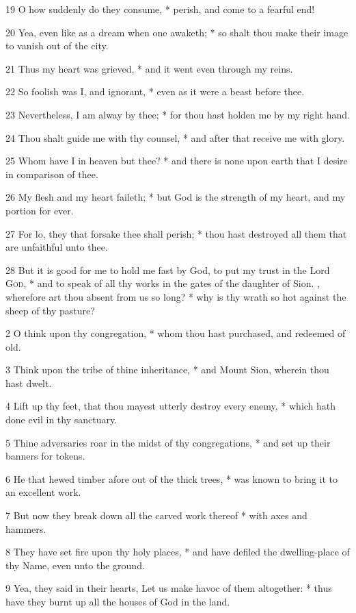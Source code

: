 19 O how suddenly do they consume, * perish, and come to a fearful end!\par
20 Yea, even like as a dream when one awaketh; * so shalt thou make their image to vanish out of the city.\par
21 Thus my heart was grieved, * and it went even through my reins.\par
22 So foolish was I, and ignorant, * even as it were a beast before thee.\par
23 Nevertheless, I am alway by thee; * for thou hast holden me by my right hand.\par
24 Thou shalt guide me with thy counsel, * and after that receive me with glory.\par
25 Whom have I in heaven but thee? * and there is none upon earth that I desire in comparison of thee.\par
26 My flesh and my heart faileth; * but God is the strength of my heart, and my portion for ever.\par
27 For lo, they that forsake thee shall perish; * thou hast destroyed all them that are unfaithful unto thee.\par
28 But it is good for me to hold me fast by God, to put my trust in the Lord \textsc{God}, * and to speak of all thy works in the gates of the daughter of Sion.
, wherefore art thou absent from us so long? * why is thy wrath so hot against the sheep of thy pasture?\par
2 O think upon thy congregation, * whom thou hast purchased, and redeemed of old.\par
3 Think upon the tribe of thine inheritance, * and Mount Sion, wherein thou hast dwelt.\par
4 Lift up thy feet, that thou mayest utterly destroy every enemy, * which hath done evil in thy sanctuary.\par
5 Thine adversaries roar in the midst of thy congregations, * and set up their banners for tokens.\par
6 He that hewed timber afore out of the thick trees, * was known to bring it to an excellent work.\par
7 But now they break down all the carved work thereof * with axes and hammers.\par
8 They have set fire upon thy holy places, * and have defiled the dwelling-place of thy Name, even unto the ground.\par
9 Yea, they said in their hearts, Let us make havoc of them altogether: * thus have they burnt up all the houses of God in the land.\par
